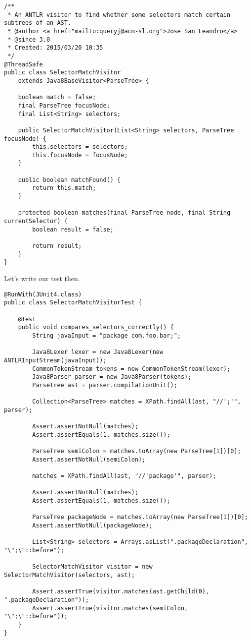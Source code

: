 \documentclass[11pt]{article}
\begin{document}
\begin{verbatim}
/**
 * An ANTLR visitor to find whether some selectors match certain subtrees of an AST.
 * @author <a href="mailto:queryj@acm-sl.org">Jose San Leandro</a>
 * @since 3.0
 * Created: 2015/03/20 10:35
 */
@ThreadSafe
public class SelectorMatchVisitor
    extends Java8BaseVisitor<ParseTree> {

    boolean match = false;
    final ParseTree focusNode;
    final List<String> selectors;

    public SelectorMatchVisitor(List<String> selectors, ParseTree focusNode) {
        this.selectors = selectors;
        this.focusNode = focusNode;
    }

    public boolean matchFound() {
        return this.match;
    }

    protected boolean matches(final ParseTree node, final String currentSelector) {
        boolean result = false;

        return result;
    }
}
\end{verbatim}

Let's write our test then.

\begin{verbatim}
@RunWith(JUnit4.class)
public class SelectorMatchVisitorTest {

    @Test
    public void compares_selectors_correctly() {
        String javaInput = "package com.foo.bar;";

        Java8Lexer lexer = new Java8Lexer(new ANTLRInputStream(javaInput));
        CommonTokenStream tokens = new CommonTokenStream(lexer);
        Java8Parser parser = new Java8Parser(tokens);
        ParseTree ast = parser.compilationUnit();

        Collection<ParseTree> matches = XPath.findAll(ast, "//';'", parser);

        Assert.assertNotNull(matches);
        Assert.assertEquals(1, matches.size());

        ParseTree semiColon = matches.toArray(new ParseTree[1])[0];
        Assert.assertNotNull(semiColon);

        matches = XPath.findAll(ast, "//'package'", parser);

        Assert.assertNotNull(matches);
        Assert.assertEquals(1, matches.size());

        ParseTree packageNode = matches.toArray(new ParseTree[1])[0];
        Assert.assertNotNull(packageNode);

        List<String> selectors = Arrays.asList(".packageDeclaration", "\";\"::before");

        SelectorMatchVisitor visitor = new SelectorMatchVisitor(selectors, ast);

        Assert.assertTrue(visitor.matches(ast.getChild(0), ".packageDeclaration"));
        Assert.assertTrue(visitor.matches(semiColon, "\";\"::before"));
    }
}
\end{verbatim}
\end{document}

